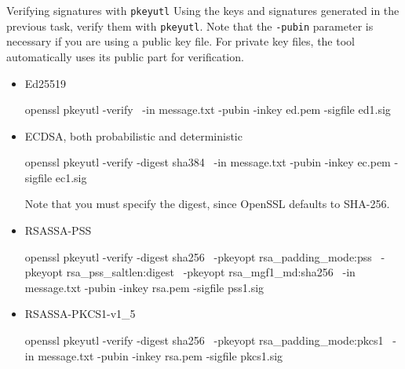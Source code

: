 \documentclass{practice}
\begin{document}
\begin{task}{Verifying signatures with \texttt{pkeyutl}}
  Using the keys and signatures generated in the previous task, verify them with \texttt{pkeyutl}.
  Note that the \texttt{-pubin} parameter is necessary if you are using a public key file.
  For private key files, the tool automatically uses its public part for verification.

  \begin{itemize}
    \item Ed25519
    \begin{cmdblock}
openssl pkeyutl -verify \
  -in message.txt -pubin -inkey ed.pem -sigfile ed1.sig
    \end{cmdblock}

    \item ECDSA, both probabilistic and deterministic
    \begin{cmdblock}
openssl pkeyutl -verify -digest sha384 \
  -in message.txt -pubin -inkey ec.pem -sigfile ec1.sig
    \end{cmdblock}

    Note that you must specify the digest, since OpenSSL defaults to SHA-256.

    \item RSASSA-PSS
    \begin{cmdblock}
openssl pkeyutl -verify -digest sha256 \
  -pkeyopt rsa_padding_mode:pss \
  -pkeyopt rsa_pss_saltlen:digest \
  -pkeyopt rsa_mgf1_md:sha256 \
  -in message.txt -pubin -inkey rsa.pem -sigfile pss1.sig
    \end{cmdblock}

    \item RSASSA-PKCS1-v1\_5
    \begin{cmdblock}
openssl pkeyutl -verify -digest sha256 \
  -pkeyopt rsa_padding_mode:pkcs1 \
  -in message.txt -pubin -inkey rsa.pem -sigfile pkcs1.sig
    \end{cmdblock}
  \end{itemize}
\end{task}
\end{document}
